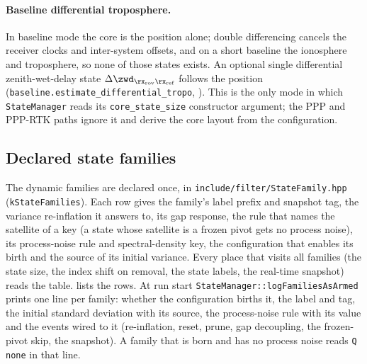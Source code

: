 \paragraph{Baseline differential troposphere.}
In baseline mode the core is the position alone; double differencing
cancels the receiver clocks and inter-system offsets, and on a short
baseline the ionosphere and troposphere, so none of those states exists.
An optional single differential zenith-wet-delay state
$\Delta\zwd_{\rx_{\mathrm{rov}}\rx_{\mathrm{ref}}}$ follows the position
(\texttt{baseline.estimate\_differential\_tropo}, ).  This is
the only mode in which \texttt{StateManager} reads its
\texttt{core\_state\_size} constructor argument; the PPP and PPP-RTK paths
ignore it and derive the core layout from the configuration.

\subsection{Declared state families}\label{sec:state-families}

The dynamic families are declared once, in \texttt{include/filter/StateFamily.hpp}
(\texttt{kStateFamilies}).  Each row gives the family's label prefix and
snapshot tag, the variance re-inflation it answers to, its gap response, the
rule that names the satellite of a key (a state whose satellite is a frozen
pivot gets no process noise), its process-noise rule and spectral-density
key, the configuration that enables its birth and the source of its initial
variance.  Every place that visits all families (the state size, the index
shift on removal, the state labels, the real-time snapshot) reads the table.
 lists the rows.  At run start
\texttt{StateManager::logFamiliesAsArmed} prints one line per family: whether
the configuration births it, the label and tag, the initial standard
deviation with its source, the process-noise rule with its value and the
events wired to it (re-inflation, reset, prune, gap decoupling, the
frozen-pivot skip, the snapshot).  A family that is born and has no process
noise reads \texttt{Q none} in that line.

